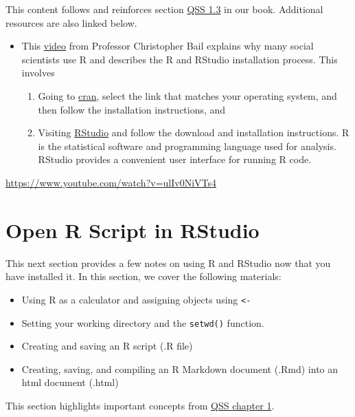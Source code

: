 \documentclass[
  letterpaper,
  DIV=11,
  numbers=noendperiod]{scrreprt}
\providecommand{\tightlist}{%
  \setlength{\itemsep}{0pt}\setlength{\parskip}{0pt}}\usepackage{longtable,booktabs,array}
\begin{document}
This content follows and reinforces section
\href{https://assets.press.princeton.edu/chapters/s11025.pdf}{QSS 1.3}
in our book. Additional resources are also linked below.

\begin{itemize}
\tightlist
\item
  This \href{http://www.youtube.com/embed/ulIv0NiVTs4?rel=0}{video} from
  Professor Christopher Bail explains why many social scientists use R
  and describes the R and RStudio installation process. This involves

  \begin{enumerate}
  \def\labelenumi{\arabic{enumi}.}
  \tightlist
  \item
    Going to \href{https://cran.r-project.org/}{cran}, select the link
    that matches your operating system, and then follow the installation
    instructions, and
  \item
    Visiting \href{http://www.rstudio.com/}{RStudio} and follow the
    download and installation instructions. R is the statistical
    software and programming language used for analysis. RStudio
    provides a convenient user interface for running R code.
  \end{enumerate}
\end{itemize}

\url{https://www.youtube.com/watch?v=ulIv0NiVTs4}

\hypertarget{open-r-script-in-rstudio}{%
\section{Open R Script in RStudio}\label{open-r-script-in-rstudio}}

This next section provides a few notes on using R and RStudio now that
you have installed it. In this section, we cover the following
materials:

\begin{itemize}
\tightlist
\item
  Using R as a calculator and assigning objects using
  \texttt{\textless{}-}
\item
  Setting your working directory and the \texttt{setwd()} function.
\item
  Creating and saving an R script (.R file)
\item
  Creating, saving, and compiling an R Markdown document (.Rmd) into an
  html document (.html)
\end{itemize}

This section highlights important concepts from
\href{https://assets.press.princeton.edu/chapters/s11025.pdf}{QSS
chapter 1}.
\end{document}
